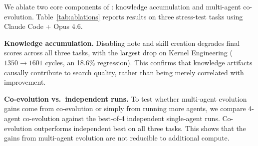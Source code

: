 We ablate two core components of \method{}: knowledge accumulation and multi-agent co-evolution. Table~\ref{tab:ablations} reports results on three stress-test tasks using Claude Code + Opus 4.6.




\textbf{Knowledge accumulation.} Disabling note and skill creation degrades final scores across all three tasks, with the largest drop on Kernel Engineering ($1350 \to 1601$ cycles, an 18.6\% regression). This confirms that knowledge artifacts causally contribute to search quality, rather than being merely correlated with improvement.

\textbf{Co-evolution vs.\ independent runs.} To test whether multi-agent evolution gains come from co-evolution or simply from running more agents, we compare 4-agent co-evolution against the best-of-4 independent single-agent runs. Co-evolution outperforms independent best on all three tasks. This shows that the gains from multi-agent evolution are not reducible to additional compute.